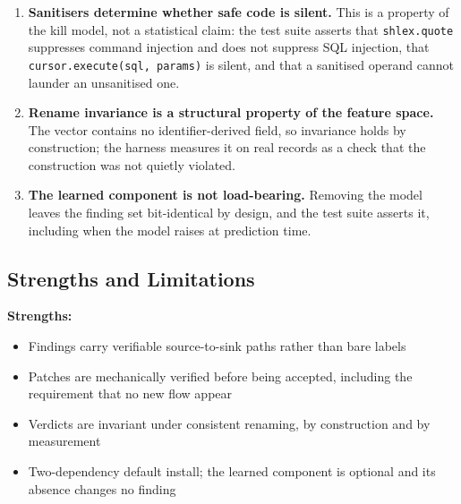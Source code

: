 \documentclass[12pt,a4paper]{article}
\begin{document}
\begin{enumerate}
    \item \textbf{Sanitisers determine whether safe code is silent.} This is a
    property of the kill model, not a statistical claim: the test suite asserts
    that \texttt{shlex.quote} suppresses command injection and does not suppress
    SQL injection, that \texttt{cursor.execute(sql, params)} is silent, and that a
    sanitised operand cannot launder an unsanitised one.
    \item \textbf{Rename invariance is a structural property of the feature space.}
    The vector contains no identifier-derived field, so invariance holds by
    construction; the harness measures it on real records as a check that the
    construction was not quietly violated.
    \item \textbf{The learned component is not load-bearing.} Removing the model
    leaves the finding set bit-identical by design, and the test suite asserts it,
    including when the model raises at prediction time.
\end{enumerate}

\subsection{Strengths and Limitations}

\textbf{Strengths:}
\begin{itemize}
    \item Findings carry verifiable source-to-sink paths rather than bare labels
    \item Patches are mechanically verified before being accepted, including the
    requirement that no new flow appear
    \item Verdicts are invariant under consistent renaming, by construction and by
    measurement
    \item Two-dependency default install; the learned component is optional and
    its absence changes no finding
\end{itemize}
\end{document}
